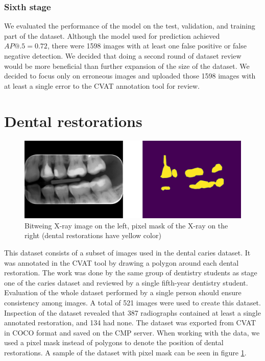 \subsubsection{Sixth stage}
We evaluated the performance of the model on the test, validation, and training part of the dataset. Although the model used for prediction achieved $AP@.5 = 0.72$, there were 1598 images with at least one false positive or false negative detection. We decided that doing a second round of dataset review would be more beneficial than further expansion of the size of the dataset. We decided to focus only on erroneous images and uploaded those 1598 images with at least a single error to the CVAT annotation tool for review.


\section{Dental restorations}
\begin{figure}
    \centering
    \includegraphics[width=\linewidth]{images/segmentation_ds_sample.pdf}
    \caption{Bitweing X-ray image on the left, pixel mask of the X-ray on the right (dental restorations have yellow color)}
    \label{fig:segmentation_sample}
\end{figure}
This dataset consists of a subset of images used in the dental caries dataset. It was annotated in the CVAT tool by drawing a polygon around each dental restoration. The work was done by the same group of dentistry students as stage one of the caries dataset and reviewed by a single fifth-year dentistry student. Evaluation of the whole dataset performed by a single person should ensure consistency among images. A total of 521 images were used to create this dataset. Inspection of the dataset revealed that 387 radiographs contained at least a single annotated restoration, and 134 had none.
The dataset was exported from CVAT in COCO format and saved on the CMP server. When working with the data, we used a pixel mask instead of polygons to denote the position of dental restorations. A sample of the dataset with pixel mask can be seen in figure \ref{fig:segmentation_sample}.

